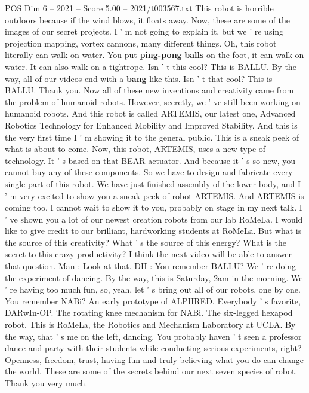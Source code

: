 \begin{textsample}{POS Dim 6 – 2021 – Score 5.00 – 2021/t003567.txt}
This robot is horrible outdoors because if the wind blows, it floats away.
Now, these are some of the images of our secret projects.
I ' m not going to explain it, but we ' re using projection mapping, vortex cannons, many different things.
Oh, this robot literally can walk on water.
You put \textbf{ping-pong} \textbf{balls} on the foot, it can walk on water.
It can also walk on a tightrope.
Isn ' t this cool?
This is BALLU.
By the way, all of our videos end with a \textbf{bang} like this.
Isn ' t that cool?
This is BALLU.
Thank you.
Now all of these new inventions and creativity came from the problem of humanoid robots.
However, secretly, we ' ve still been working on humanoid robots.
And this robot is called ARTEMIS, our latest one, Advanced Robotics Technology for Enhanced Mobility and Improved Stability.
And this is the very first time I ' m showing it to the general public.
This is a sneak peek of what is about to come.
Now, this robot, ARTEMIS, uses a new type of technology.
It ' s based on that BEAR actuator.
And because it ' s so new, you cannot buy any of these components.
So we have to design and fabricate every single part of this robot.
We have just finished assembly of the lower body, and I ' m very excited to show you a sneak peek of robot ARTEMIS.
And ARTEMIS is coming too, I cannot wait to show it to you, probably on stage in my next talk.
I ' ve shown you a lot of our newest creation robots from our lab RoMeLa.
I would like to give credit to our brilliant, hardworking students at RoMeLa.
But what is the source of this creativity?
What ' s the source of this energy?
What is the secret to this crazy productivity?
I think the next video will be able to answer that question.
Man : Look at that.
DH : You remember BALLU?
We ' re doing the experiment of dancing.
By the way, this is Saturday, 2am in the morning.
We ' re having too much fun, so, yeah, let ' s bring out all of our robots, one by one.
You remember NABi?
An early prototype of ALPHRED.
Everybody ' s favorite, DARwIn-OP.
The rotating knee mechanism for NABi.
The six-legged hexapod robot.
This is RoMeLa, the Robotics and Mechanism Laboratory at UCLA.
By the way, that ' s me on the left, dancing.
You probably haven ' t seen a professor dance and party with their students while conducting serious experiments, right?
Openness, freedom, trust, having fun and truly believing what you do can change the world.
These are some of the secrets behind our next seven species of robot.
Thank you very much.

\end{textsample}
